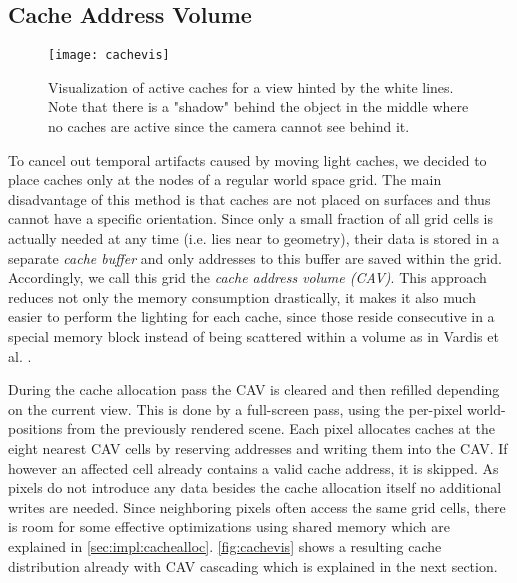 \documentclass[thesis.tex]{subfiles}
\begin{document}
\subsection{Cache Address Volume}
\begin{figure}[h]
	\centering
	\texttt{[image: cachevis]}
	\caption{Visualization of active caches for a view hinted by the white lines. Note that there is a "shadow" behind the object in the middle where no caches are active since the camera cannot see behind it.} \label{fig:cachevis}
\end{figure}
To cancel out temporal artifacts caused by moving light caches, we decided to place caches only at the nodes of a regular world space grid.
The main disadvantage of this method is that caches are not placed on surfaces and thus cannot have a specific orientation.
Since only a small fraction of all grid cells is actually needed at any time (i.e. lies near to geometry), their data is stored in a separate \emph{cache buffer} and only addresses to this buffer are saved within the grid.
Accordingly, we call this grid the \emph{cache address volume (CAV)}.
This approach reduces not only the memory consumption drastically, it makes it also much easier to perform the lighting for each cache, since those reside consecutive in a special memory block instead of being scattered within a volume as in Vardis et al. \cite{bib:radiancecachechromaticcompression}.

During the cache allocation pass the CAV is cleared and then refilled depending on the current view.
This is done by a full-screen pass, using the per-pixel world-positions from the previously rendered scene. %
Each pixel allocates caches at the eight nearest CAV cells by reserving addresses and writing them into the CAV.
If however an affected cell already contains a valid cache address, it is skipped.
As pixels do not introduce any data besides the cache allocation itself no additional writes are needed.
Since neighboring pixels often access the same grid cells, there is room for some effective optimizations using shared memory which are explained in \autoref{sec:impl:cachealloc}.
\autoref{fig:cachevis} shows a resulting cache distribution already with CAV cascading which is explained in the next section.
\end{document}
